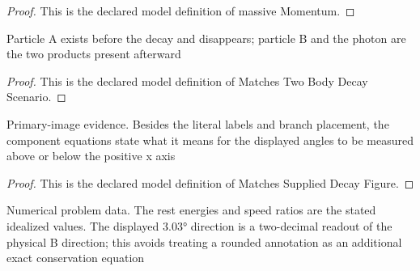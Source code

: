\begin{proof}
  This is the declared model definition of massive Momentum.
\end{proof}
\begin{definition}
  \label{def:physics:phyx-mini-0556:phyxminiproblems-problemphyxmini0556-matchestwobodydecayscenario}
  Particle A exists before the decay and disappears; particle B and the photon are the two products present afterward
\end{definition}
\begin{proof}
  This is the declared model definition of Matches Two Body Decay Scenario.
\end{proof}
\begin{definition}
  \label{def:physics:phyx-mini-0556:phyxminiproblems-problemphyxmini0556-matchessupplieddecayfigure}
  Primary-image evidence. Besides the literal labels and branch placement, the component equations state what it means for the displayed angles to be measured above or below the positive x axis
\end{definition}
\begin{proof}
  This is the declared model definition of Matches Supplied Decay Figure.
\end{proof}
\begin{definition}
  \label{def:physics:phyx-mini-0556:phyxminiproblems-problemphyxmini0556-matchesproblemreadouts}
  Numerical problem data. The rest energies and speed ratios are the stated idealized values. The displayed 3.03° direction is a two-decimal readout of the physical B direction; this avoids treating a rounded annotation as an additional exact conservation equation
\end{definition}
